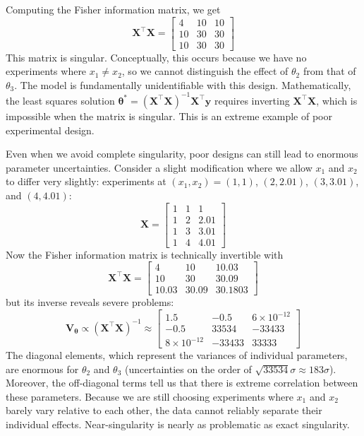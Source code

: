 Computing the Fisher information matrix, we get
\begin{equation}
    \mathbf{X}^\top \mathbf{X} = \begin{bmatrix} 4 & 10 & 10 \\ 10 & 30 & 30 \\ 10 & 30 & 30 \end{bmatrix}
\end{equation}
This matrix is singular. Conceptually, this occurs because we have no experiments where $x_1 \neq x_2$, so we cannot distinguish the effect of $\theta_2$ from that of $\theta_3$. The model is fundamentally unidentifiable with this design. Mathematically, the least squares solution $\boldsymbol{\theta}^* = (\mathbf{X}^\top \mathbf{X})^{-1} \mathbf{X}^\top \mathbf{y}$ requires inverting $\mathbf{X}^\top \mathbf{X}$, which is impossible when the matrix is singular. This is an extreme example of poor experimental design.

Even when we avoid complete singularity, poor designs can still lead to enormous parameter uncertainties. Consider a slight modification where we allow $x_1$ and $x_2$ to differ very slightly: experiments at $(x_1, x_2) = (1, 1)$, $(2, 2.01)$, $(3, 3.01)$, and $(4, 4.01)$:
\begin{equation}
    \mathbf{X} = \begin{bmatrix} 1 & 1 & 1 \\ 1 & 2 & 2.01 \\ 1 & 3 & 3.01 \\ 1 & 4 & 4.01 \end{bmatrix}
\end{equation}
Now the Fisher information matrix is technically invertible with
\begin{equation}
    \mathbf{X}^\top \mathbf{X} = \begin{bmatrix} 4 & 10 & 10.03 \\ 10 & 30 & 30.09 \\ 10.03 & 30.09 & 30.1803 \end{bmatrix}
\end{equation}
but its inverse reveals severe problems:
\begin{equation}
    \mathbf{V}_{\boldsymbol{\theta}} \propto \left(\mathbf{X}^\top \mathbf{X}\right)^{-1} \approx \begin{bmatrix} 1.5 & -0.5 & 6 \times 10^{-12} \\ -0.5 & 33534 & -33433 \\ 8 \times 10^{-12} & -33433 & 33333 \end{bmatrix}
\end{equation}
The diagonal elements, which represent the variances of individual parameters, are enormous for $\theta_2$ and $\theta_3$ (uncertainties on the order of $\sqrt{33534} \sigma \approx 183\sigma$). Moreover, the off-diagonal terms tell us that there is extreme correlation between these parameters. Because we are still choosing experiments where $x_1$ and $x_2$ barely vary relative to each other, the data cannot reliably separate their individual effects. Near-singularity is nearly as problematic as exact singularity.

